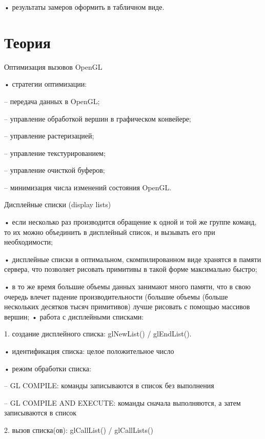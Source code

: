 \documentclass[a4paper, 14pt]{extarticle}
\begin{document}
• результаты замеров оформить в табличном виде.

\section{Теория}\label{Sect::task}
\par

\begin{center}
\Large {Оптимизация вызовов OpenGL} \\ 
\end{center}\normalsize

• стратегии оптимизации:

– передача данных в OpenGL;

– управление обработкой вершин в графическом конвейере;

– управление растеризацией;

– управление текстурированием;

– управление очисткой буферов;

– минимизация числа изменений состояния OpenGL.

\begin{center}
\Large {Дисплейные списки (display lists)} \\ 
\end{center}\normalsize

• если несколько раз производится обращение к одной и той же группе команд, то их можно объединить в дисплейный список, и вызывать его при необходимости;

• дисплейные списки в оптимальном, скомпилированном виде хранятся в памяти сервера, что позволяет рисовать примитивы в такой форме максимально быстро;

• в то же время большие объемы данных занимают много памяти, что в свою очередь влечет падение производительности (большие объемы (больше нескольких десятков тысяч примитивов) лучше рисовать с помощью массивов вершин;
• работа с дисплейными списками:

1. создание дисплейного списка: glNewList() / glEndList().

    • идентификация списка: целое положительное число

    • режим обработки списка:

        – GL COMPILE: команды записываются в список без выполнения

        – GL COMPILE AND EXECUTE: команды сначала выполняются, а затем записываются в список

2. вызов списка(ов): glCallList() / glCallLists()
\end{document}
